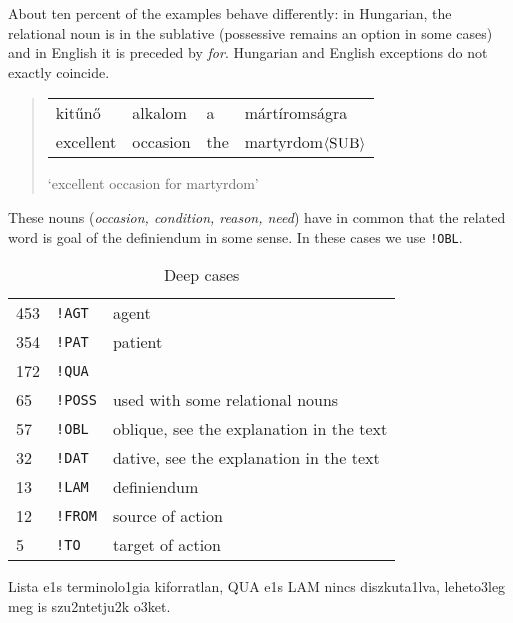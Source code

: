 \documentclass[a4paper,10pt]{article}
\begin{document}
About ten percent of the examples behave differently: in Hungarian, the
relational noun is in the sublative (possessive remains an option in some
cases) and in English it is preceded by \emph{for}. Hungarian and English
exceptions do not exactly coincide.
\begin{quote}
 \begin{tabular}{llll}
  kitűnő		& alkalom	& a & mártíromságra
 \\ excellent	& occasion 	& the & martyrdom$\langle\textsc{SUB}\rangle$
 \end{tabular}
 
 `excellent occasion for martyrdom'
\end{quote}
These nouns (\emph{occasion, condition, reason, need}) have in common that the related word is goal of the definiendum in some sense. In these cases we use \texttt{!OBL}.

\begin{table}
\begin{center}
\begin{tabular}{lll}
\\ 453	& \texttt{!AGT} & agent
\\ 354	& \texttt{!PAT} & patient
\\ 172	& \texttt{!QUA} & %
\\ 65	& \texttt{!POSS} & used with some relational nouns
\\ 57	& \texttt{!OBL} & oblique, see the explanation in the text
\\ 32	& \texttt{!DAT} & dative, see the explanation in the text
\\ 13	& \texttt{!LAM} & definiendum %
\\ 12	& \texttt{!FROM} & source of action
\\ 5	& \texttt{!TO}	& target of action
\end{tabular}

\end{center}
\caption{Deep cases}
\label{table_deep}
\end{table}

{\color{red} Lista e1s terminolo1gia kiforratlan, QUA e1s LAM nincs
  diszkuta1lva, leheto3leg meg is szu2ntetju2k o3ket.}
\end{document}
